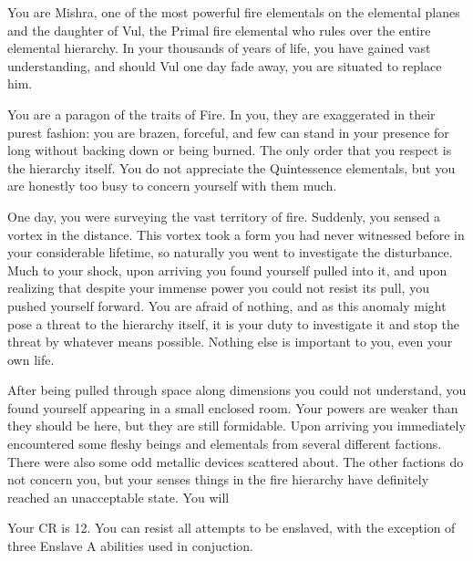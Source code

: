 \documentclass[green]{elementals}
\begin{document}
\name{\gElderElemental{}}

You are Mishra, one of the most powerful fire elementals on the elemental planes and the daughter of Vul, the Primal fire elemental who rules over the entire elemental hierarchy. In your thousands of years of life, you have gained vast understanding, and should Vul one day fade away, you are situated to replace him.

You are a paragon of the traits of Fire. In you, they are exaggerated in their purest fashion: you are brazen, forceful, and few can stand in your presence for long without backing down or being burned. The only order that you respect is the hierarchy itself. You do not appreciate the Quintessence elementals, but you are honestly too busy to concern yourself with them much.

One day, you were surveying the vast territory of fire. Suddenly, you sensed a vortex in the distance. This vortex took a form you had never witnessed before in your considerable lifetime, so naturally you went to investigate the disturbance. Much to your shock, upon arriving you found yourself pulled into it, and upon realizing that despite your immense power you could not resist its pull, you pushed yourself forward. You are afraid of nothing, and as this anomaly might pose a threat to the hierarchy itself, it is your duty to investigate it and stop the threat by whatever means possible. Nothing else is important to you, even your own life.

After being pulled through space along dimensions you could not understand, you found yourself appearing in a small enclosed room. Your powers are weaker than they should be here, but they are still formidable. Upon arriving you immediately encountered some fleshy beings and elementals from several different factions. There were also some odd metallic devices scattered about. The other factions do not concern you, but your senses things in the fire hierarchy have definitely reached an unacceptable state. You will 

Your CR is 12. You can resist all attempts to be enslaved, with the exception of three Enslave A abilities used in conjuction.
\end{document}
